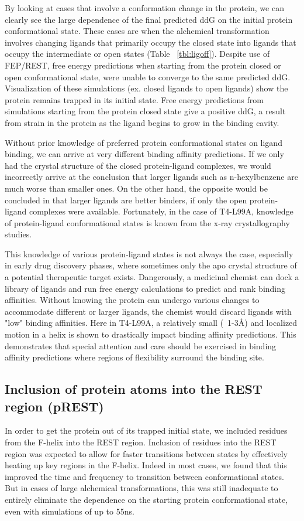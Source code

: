 \documentclass[journal=jctcce,manuscript=article]{achemso}
\begin{document}
By looking at cases that involve a conformation change in the protein, we can clearly see the large dependence of the final predicted ddG on the initial protein conformational state.
These cases are when the alchemical transformation involves changing ligands that primarily occupy the closed state into ligands that occupy the intermediate or open states (Table ~\ref{tbl:ligoff}).
Despite use of FEP/REST, free energy predictions when starting from the protein closed or open conformational state, were unable to converge to the same predicted ddG.
Visualization of these simulations (ex. closed ligands to open ligands) show the protein remains trapped in its initial state.
Free energy predictions from simulations starting from the protein closed state give a positive ddG, a result from strain in the protein as the ligand begins to grow in the binding cavity.

Without prior knowledge of preferred protein conformational states on ligand binding, we can arrive at very different binding affinity predictions.
If we only had the crystal structure of the closed protein-ligand complexes, we would incorrectly arrive at the conclusion that larger ligands such as n-hexylbenzene are much worse than smaller ones.
On the other hand, the opposite would be concluded in that larger ligands are better binders, if only the open protein-ligand complexes were available.
Fortunately, in the case of T4-L99A, knowledge of protein-ligand conformational states is known from the x-ray crystallography studies. \cite{Merski2015}

This knowledge of various protein-ligand states is not always the case, especially in early drug discovery phases, where sometimes only the apo crystal structure of a potential therapeutic target exists.
Dangerously, a medicinal chemist can dock a library of ligands and run free energy calculations to predict and rank binding affinities.
Without knowing the protein can undergo various changes to accommodate different or larger ligands, the chemist would discard ligands with "low" binding affinities.
Here in T4-L99A, a relatively small (~1-3\AA) and localized motion in a helix is shown to drastically impact binding affinity predictions.
This demonstrates that special attention and care should be exercised in binding affinity predictions where regions of flexibility surround the binding site.

\subsection*{Inclusion of protein atoms into the REST region (pREST)}
In order to get the protein out of its trapped initial state, we included residues from the F-helix into the REST region.
Inclusion of residues into the REST region was expected to allow for faster transitions between states by effectively heating up key regions in the F-helix.
Indeed in most cases, we found that this improved the time and frequency to transition between conformational states.
But in cases of large alchemical transformations, this was still inadequate to entirely eliminate the dependence on the starting protein conformational state, even with simulations of up to 55ns.
\end{document}
